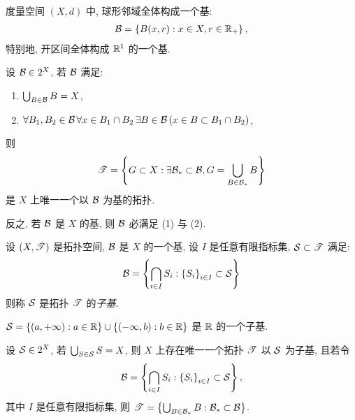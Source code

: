     \begin{Example}
        度量空间 $ (X, d) $ 中, 球形邻域全体构成一个基:
        \begin{align*}
            \mathcal{B}=\left\{ B(x, r): x\in X,r\in\mathbb{R}_{+} \right\},
        \end{align*}
        特别地, 开区间全体构成 $ \mathbb{R}^{1} $ 的一个基. 
    \end{Example}

    \begin{Theorem}[基的判别准则]
        设 $ \mathcal{B}\in 2^{X} $, 若 $ \mathcal{B} $ 满足:
        \begin{enumerate}
            \item $ \bigcup_{B\in\mathcal{B}}B=X $,
            \item $ \forall B_{1}, B_{2}\in\mathcal{B}\,\forall x\in B_{1}\cap B_{2}\,\exists B\in\mathcal{B}\,(x\in B\subset B_{1}\cap B_{2}) $,
        \end{enumerate}
        则
        \begin{align*}
            \mathscr{T} = \left\{ G\subset X: \exists \mathcal{B}_{*}\subset \mathcal{B}, G=\bigcup_{B\in \mathcal{B}_{*}}B \right\}
        \end{align*}
        是 $ X $ 上唯一一个以 $ \mathcal{B} $ 为基的拓扑.

        反之, 若 $ \mathcal{B} $ 是 $ X $ 的基, 则 $ \mathcal{B} $ 必满足 (1) 与 (2).
    \end{Theorem}

    \begin{Definition}[子基]
        设 $ (X, \mathscr{T}) $ 是拓扑空间, $ \mathcal{B} $ 是 $ X $ 的一个基, 设 $ I $ 是任意有限指标集, $ \mathcal{S}\subset\mathscr{T} $ 满足:
        \begin{align*}
            \mathcal{B}=\left\{ \bigcap_{i\in I}S_{i}: \left\{ S_{i} \right\}_{i\in I}\subset\mathcal{S} \right\}
        \end{align*}
        则称 $ \mathcal{S} $ 是拓扑 $ \mathscr{T} $ 的\emph{子基}.
    \end{Definition}

    \begin{Example}
        $ \mathcal{S}=\left\{ (a, +\infty): a\in\mathbb{R} \right\}\cup \left\{ (-\infty, b): b\in \mathbb{R} \right\} $ 是 $ \mathbb{R} $ 的一个子基. 
    \end{Example}

    \begin{Theorem}[子基的判别准则]
        设 $ \mathcal{S}\in 2^{X} $, 若 $ \bigcup_{S\in\mathcal{S}}S=X $, 则 $ X $ 上存在唯一一个拓扑 $ \mathscr{T} $ 以 $ \mathcal{S} $ 为子基, 且若令
        \begin{align*}
            \mathcal{B}=\left\{ \bigcap_{i\in I}S_{i}: \left\{ S_{i} \right\}_{i\in I}\subset \mathcal{S} \right\},
        \end{align*}
        其中 $ I $ 是任意有限指标集, 则 $ \mathscr{T}=\left\{ \bigcup_{B\in \mathcal{B}_{*}}B: \mathcal{B}_{*}\subset\mathcal{B} \right\} $.
    \end{Theorem}

